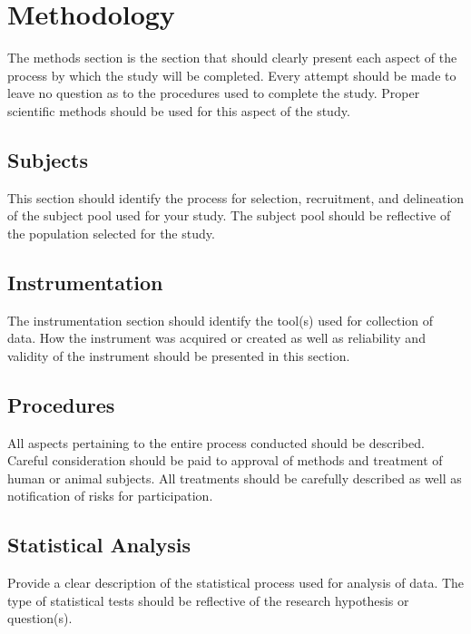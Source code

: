\chapter{Methodology}

The methods section is the section that should clearly present each aspect of the process by which the study will be completed. Every attempt should be made to leave no question as to the procedures used to complete the study. Proper scientific methods should be used for this aspect of the study.

\section{Subjects}
This section should identify the process for selection, recruitment, and delineation of the subject pool used for your study. The subject pool should be reflective of the population selected for the study.

\section{Instrumentation}
The instrumentation section should identify the tool(s) used for collection of data. How the instrument was acquired or created as well as reliability and validity of the instrument should be presented in this section.

\section{Procedures}
All aspects pertaining to the entire process conducted should be described. Careful consideration should be paid to approval of methods and treatment of human or animal subjects. All treatments should be carefully described as well as notification of risks for participation.

\section{Statistical Analysis}
Provide a clear description of the statistical process used for analysis of data. The type of statistical tests should be reflective of the research hypothesis or question(s).
